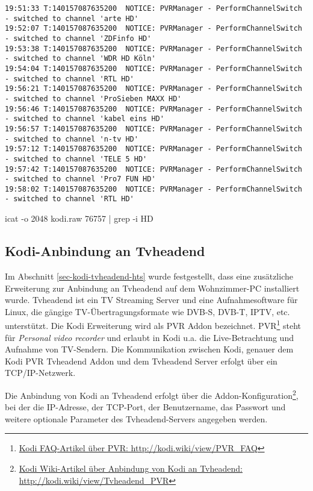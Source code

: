 \begin{cmd}[H]
\begin{Verbatim}[fontsize=\tiny]
19:51:33 T:140157087635200  NOTICE: PVRManager - PerformChannelSwitch - switched to channel 'arte HD'
19:52:07 T:140157087635200  NOTICE: PVRManager - PerformChannelSwitch - switched to channel 'ZDFinfo HD'
19:53:38 T:140157087635200  NOTICE: PVRManager - PerformChannelSwitch - switched to channel 'WDR HD Köln'
19:54:04 T:140157087635200  NOTICE: PVRManager - PerformChannelSwitch - switched to channel 'RTL HD'
19:56:21 T:140157087635200  NOTICE: PVRManager - PerformChannelSwitch - switched to channel 'ProSieben MAXX HD'
19:56:46 T:140157087635200  NOTICE: PVRManager - PerformChannelSwitch - switched to channel 'kabel eins HD'
19:56:57 T:140157087635200  NOTICE: PVRManager - PerformChannelSwitch - switched to channel 'n-tv HD'
19:57:12 T:140157087635200  NOTICE: PVRManager - PerformChannelSwitch - switched to channel 'TELE 5 HD'
19:57:42 T:140157087635200  NOTICE: PVRManager - PerformChannelSwitch - switched to channel 'Pro7 FUN HD'
19:58:02 T:140157087635200  NOTICE: PVRManager - PerformChannelSwitch - switched to channel 'RTL HD'
\end{Verbatim}
\caption{icat -o 2048 kodi.raw 76757 | grep -i HD}
\label{cmd:kodi-loghd}
\end{cmd}

\subsection{Kodi-Anbindung an Tvheadend}
\label{sec:kodi-tvheadend}

Im Abschnitt \autoref{sec-kodi-tvheadend-hts} wurde festgestellt, dass eine zusätzliche Erweiterung zur Anbindung an Tvheadend auf dem Wohnzimmer-PC installiert wurde. Tvheadend ist ein TV Streaming Server und eine Aufnahmesoftware für Linux, die gängige TV-Übertragungsformate wie DVB-S, DVB-T, IPTV, etc. unterstützt. Die Kodi Erweiterung wird als PVR Addon bezeichnet. PVR\footnote{\href{http://kodi.wiki/view/PVR\_FAQ}{Kodi FAQ-Artikel über PVR: http://kodi.wiki/view/PVR\_FAQ}} steht für \textit{Personal video recorder} und erlaubt in Kodi u.a. die Live-Betrachtung und Aufnahme von TV-Sendern. Die Kommunikation zwischen Kodi, genauer dem Kodi PVR Tvheadend Addon und dem Tvheadend Server erfolgt über ein TCP/IP-Netzwerk.

Die Anbindung von Kodi an Tvheadend erfolgt über die Addon-Konfiguration\footnote{\href{http://kodi.wiki/view/Tvheadend\_PVR\#Connecting\_Kodi\_to\_Tvheadend}{Kodi Wiki-Artikel über Anbindung von Kodi an Tvheadend: http://kodi.wiki/view/Tvheadend\_PVR}}, bei der die IP-Adresse, der TCP-Port, der Benutzername, das Passwort und weitere optionale Parameter des Tvheadend-Servers angegeben werden.

